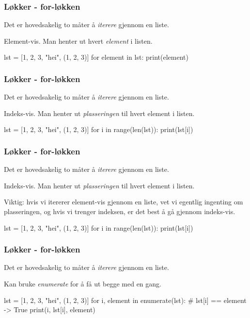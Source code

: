 \begin{frame}[fragile]
    \frametitle{Løkker - for-løkken}

    Det er hovedsakelig to måter å \textit{iterere} gjennom en liste. 

    Element-vis. Man henter ut hvert \textit{element} i listen.

\begin{python}
lst = [1, 2, 3, "hei", (1, 2, 3)]
for element in lst: 
    print(element)
\end{python}

\end{frame}

\begin{frame}[fragile]
    \frametitle{Løkker - for-løkken}

    Det er hovedsakelig to måter å \textit{iterere} gjennom en liste. 

    Indeks-vis. Man henter ut \textit{plasseringen} til hvert element i listen. 

\begin{python}
lst = [1, 2, 3, "hei", (1, 2, 3)]
for i in range(len(lst)): 
    print(lst[i])
\end{python}

\end{frame}

\begin{frame}[fragile]
    \frametitle{Løkker - for-løkken}

    Det er hovedsakelig to måter å \textit{iterere} gjennom en liste. 

    Indeks-vis. Man henter ut \textit{plasseringen} til hvert element i listen. 

    Viktig: hvis vi itererer element-vis gjennom en liste, vet vi egentlig ingenting om plasseringen, og hvis vi trenger indeksen, er det best å gå gjennom indeks-vis. 

\begin{python}
lst = [1, 2, 3, "hei", (1, 2, 3)]
for i in range(len(lst)): 
    print(lst[i])
\end{python}

\end{frame}

\begin{frame}[fragile]
    \frametitle{Løkker - for-løkken}

    Det er hovedsakelig to måter å \textit{iterere} gjennom en liste. 

    Kan bruke \textit{enumerate} for å få ut begge med en gang. 

\begin{python}
lst = [1, 2, 3, "hei", (1, 2, 3)]
for i, element in enumerate(lst): 
    # lst[i] == element -> True
    print(i, lst[i], element)
\end{python}

\end{frame}

